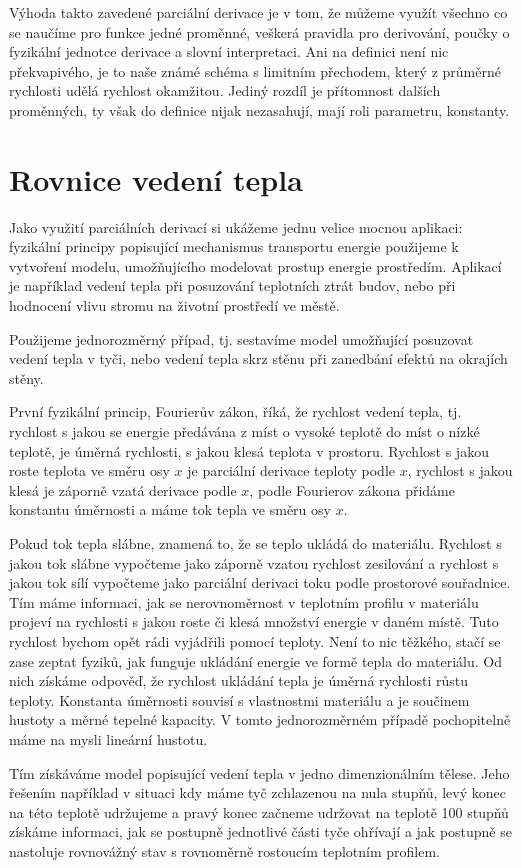 \documentclass[12pt]{article}
\begin{document}
Výhoda takto zavedené parciální derivace je v tom, že můžeme využít všechno co se naučíme pro funkce jedné proměnné, veškerá pravidla pro derivování, poučky o fyzikální jednotce derivace a slovní interpretaci. Ani na definici není nic překvapivého, je to naše známé schéma s limitním přechodem, který z průměrné rychlosti udělá rychlost okamžitou. Jediný rozdíl je přítomnost dalších proměnných, ty však do definice nijak nezasahují, mají roli parametru, konstanty.

\newpage
\section*{Rovnice vedení tepla}


Jako využití parciálních derivací si ukážeme jednu velice mocnou aplikaci: fyzikální principy popisující mechanismus transportu energie použijeme k vytvoření modelu, umožňujícího modelovat prostup energie prostředím. Aplikací je například vedení tepla při posuzování teplotních ztrát budov, nebo při hodnocení vlivu stromu na životní prostředí ve městě.

Použijeme jednorozměrný případ, tj. sestavíme model umožňující posuzovat vedení tepla v tyči, nebo vedení tepla skrz stěnu při zanedbání efektů na okrajích stěny. 

První fyzikální princip, Fourierův zákon, říká, že rychlost vedení tepla, tj. rychlost s jakou se energie předávána z míst o vysoké teplotě do míst o nízké teplotě, je úměrná rychlosti, s jakou klesá teplota v prostoru. Rychlost s jakou roste teplota ve směru osy $x$ je parciální derivace teploty podle $x$, rychlost s jakou klesá je záporně vzatá derivace podle $x$, podle Fourierov zákona přidáme konstantu úměrnosti a máme tok tepla ve směru osy $x$.

Pokud tok tepla slábne, znamená to, že se teplo ukládá do materiálu. Rychlost s jakou tok slábne vypočteme jako záporně vzatou rychlost zesilování a rychlost s jakou tok sílí vypočteme jako parciální derivaci toku podle prostorové souřadnice. Tím máme informaci, jak se nerovnoměrnost v teplotním profilu v materiálu projeví na rychlosti s jakou roste či klesá množství energie v daném místě. Tuto rychlost bychom opět rádi vyjádřili pomocí teploty. Není to nic těžkého, stačí se zase zeptat fyziků, jak funguje ukládání energie ve formě tepla do materiálu. Od nich získáme odpověď, že rychlost ukládání tepla je úměrná rychlosti růstu teploty. Konstanta úměrnosti souvisí s vlastnostmi materiálu a je součinem hustoty a měrné tepelné kapacity. V tomto jednorozměrném případě pochopitelně máme na mysli lineární hustotu. 

Tím získáváme model popisující vedení tepla v jedno dimenzionálním tělese. Jeho řešením například v situaci kdy máme tyč zchlazenou na nula stupňů, levý konec na této teplotě udržujeme a pravý konec začneme udržovat na teplotě 100 stupňů získáme informaci, jak se postupně jednotlivé části tyče ohřívají a jak postupně se nastoluje rovnovážný stav s rovnoměrně rostoucím teplotním profilem.
\end{document}
